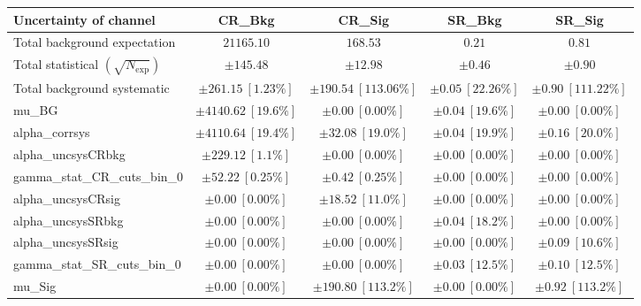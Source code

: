 
\begin{table}
\centering
\small
\begin{tabular*}{\textwidth}{@{\extracolsep{\fill}}lcccc}
\toprule
\textbf{Uncertainty of channel}                                    & CR\_Bkg            & CR\_Sig            & SR\_Bkg            & SR\_Sig            \\
\midrule
Total background expectation             &  $21165.10$        &  $168.53$        &  $0.21$        &  $0.81$       \\
\midrule
Total statistical $(\sqrt{N_{\mathrm{exp}}})$              & $\pm 145.48$        & $\pm 12.98$        & $\pm 0.46$        & $\pm 0.90$       \\
Total background systematic               & $\pm 261.15\ [1.23\%] $        & $\pm 190.54\ [113.06\%] $        & $\pm 0.05\ [22.26\%] $        & $\pm 0.90\ [111.22\%] $             \\
\midrule
mu\_BG         & $\pm 4140.62\ [19.6\%] $          & $\pm 0.00\ [0.00\%] $          & $\pm 0.04\ [19.6\%] $          & $\pm 0.00\ [0.00\%] $       \\
alpha\_corrsys         & $\pm 4110.64\ [19.4\%] $          & $\pm 32.08\ [19.0\%] $          & $\pm 0.04\ [19.9\%] $          & $\pm 0.16\ [20.0\%] $       \\
alpha\_uncsysCRbkg         & $\pm 229.12\ [1.1\%] $          & $\pm 0.00\ [0.00\%] $          & $\pm 0.00\ [0.00\%] $          & $\pm 0.00\ [0.00\%] $       \\
gamma\_stat\_CR\_cuts\_bin\_0         & $\pm 52.22\ [0.25\%] $          & $\pm 0.42\ [0.25\%] $          & $\pm 0.00\ [0.00\%] $          & $\pm 0.00\ [0.00\%] $       \\
alpha\_uncsysCRsig         & $\pm 0.00\ [0.00\%] $          & $\pm 18.52\ [11.0\%] $          & $\pm 0.00\ [0.00\%] $          & $\pm 0.00\ [0.00\%] $       \\
alpha\_uncsysSRbkg         & $\pm 0.00\ [0.00\%] $          & $\pm 0.00\ [0.00\%] $          & $\pm 0.04\ [18.2\%] $          & $\pm 0.00\ [0.00\%] $       \\
alpha\_uncsysSRsig         & $\pm 0.00\ [0.00\%] $          & $\pm 0.00\ [0.00\%] $          & $\pm 0.00\ [0.00\%] $          & $\pm 0.09\ [10.6\%] $       \\
gamma\_stat\_SR\_cuts\_bin\_0         & $\pm 0.00\ [0.00\%] $          & $\pm 0.00\ [0.00\%] $          & $\pm 0.03\ [12.5\%] $          & $\pm 0.10\ [12.5\%] $       \\
mu\_Sig         & $\pm 0.00\ [0.00\%] $          & $\pm 190.80\ [113.2\%] $          & $\pm 0.00\ [0.00\%] $          & $\pm 0.92\ [113.2\%] $       \\


\end{tabular*}
\end{table}
